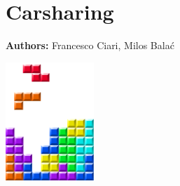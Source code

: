 \chapter{Carsharing}
\label{ch:carsharing}

\hfill \textbf{Authors:} Francesco Ciari, Milos Balać

\begin{center} \includegraphics[width=0.25\textwidth, angle=0]{frontmatter/figures/MATSimBook.png} \end{center}


